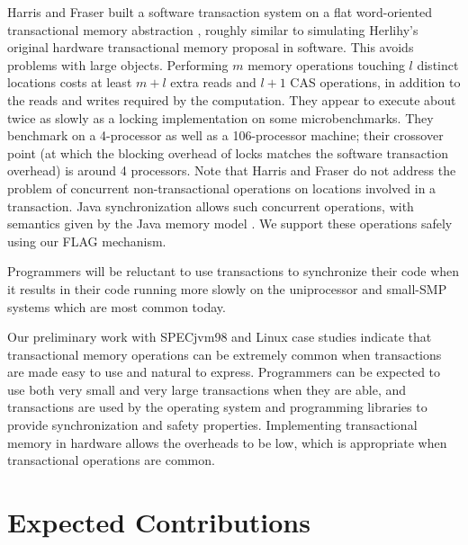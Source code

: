 \documentclass[12pt,twoside]{article}
\newcommand{\note}[1]{}%
\begin{document}
Harris and Fraser built a software transaction system on a flat
word-oriented transactional memory abstraction \cite{HarrisFr03},
roughly similar to simulating Herlihy's original hardware
transactional memory proposal in software.  This avoids problems with
large objects.  Performing $m$ memory operations touching $l$ distinct
locations costs at least $m+l$ extra reads and $l+1$ CAS operations, in
addition to the reads and writes required by the computation.
They appear to execute about twice as slowly as a locking
implementation on some microbenchmarks.  They benchmark on a
4-processor as well as a 106-processor machine; their crossover point
(at which the blocking overhead of locks matches the software
transaction overhead) is around 4 processors.
Note that Harris and Fraser do not address the problem of
concurrent non-transactional operations on locations involved in a
transaction.  Java synchronization allows such concurrent operations,
with semantics given by the Java memory model \cite{MansonPu02}.
We support these operations safely using our FLAG mechanism.

Programmers will be reluctant to use transactions to synchronize their
code when it results in their code running more slowly on the uniprocessor
and small-SMP systems which are most common today.
\note{Segue into hardware transactions writeup?}

Our preliminary work with SPECjvm98 and Linux case studies indicate that
transactional memory operations can be extremely common when
transactions are made easy to use and natural to express.  Programmers
can be expected to use both very small and very large transactions
when they are able, and transactions are used by the operating system
and programming libraries to provide synchronization and safety
properties.  Implementing transactional memory in hardware allows the
overheads to be low\note{\textbf{cite figures here}}, which is appropriate
when transactional operations are common.

\section{Expected Contributions}
\end{document}
